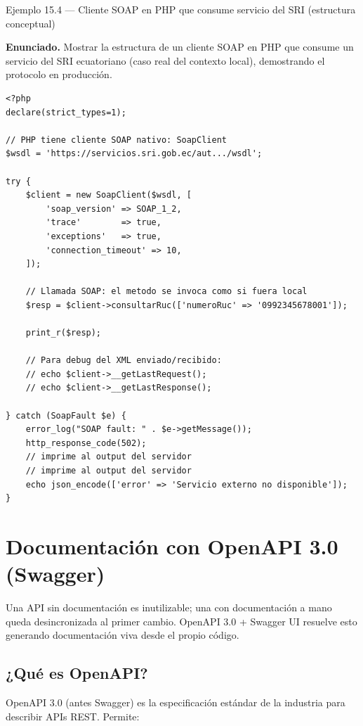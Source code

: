 \documentclass[11pt,a4paper,openany]{book}
\begin{document}
\begin{cajaejemplo}{Ejemplo 15.4 --- Cliente SOAP en PHP que consume servicio del SRI (estructura conceptual)}

\textbf{Enunciado.} Mostrar la estructura de un cliente SOAP en PHP que consume un servicio del SRI ecuatoriano (caso real del contexto local), demostrando el protocolo en producción.

\begin{lstlisting}[style=php,caption={consultar-ruc.php},label=lst:15.7]
<?php
declare(strict_types=1);

// PHP tiene cliente SOAP nativo: SoapClient
$wsdl = 'https://servicios.sri.gob.ec/aut.../wsdl';

try {
    $client = new SoapClient($wsdl, [
        'soap_version' => SOAP_1_2,
        'trace'        => true,
        'exceptions'   => true,
        'connection_timeout' => 10,
    ]);

    // Llamada SOAP: el metodo se invoca como si fuera local
    $resp = $client->consultarRuc(['numeroRuc' => '0992345678001']);

    print_r($resp);

    // Para debug del XML enviado/recibido:
    // echo $client->__getLastRequest();
    // echo $client->__getLastResponse();

} catch (SoapFault $e) {
    error_log("SOAP fault: " . $e->getMessage());
    http_response_code(502);
    // imprime al output del servidor
    // imprime al output del servidor
    echo json_encode(['error' => 'Servicio externo no disponible']);
}
\end{lstlisting}
\end{cajaejemplo}

\section{Documentación con OpenAPI 3.0 (Swagger)}

Una API sin documentación es inutilizable; una con
documentación a mano queda desincronizada al primer cambio.
OpenAPI 3.0 + Swagger UI resuelve esto generando documentación viva
desde el propio código.


\subsection{¿Qué es OpenAPI?}

OpenAPI 3.0 (antes Swagger) es la especificación estándar de la
industria para describir APIs REST. Permite:
\end{document}
